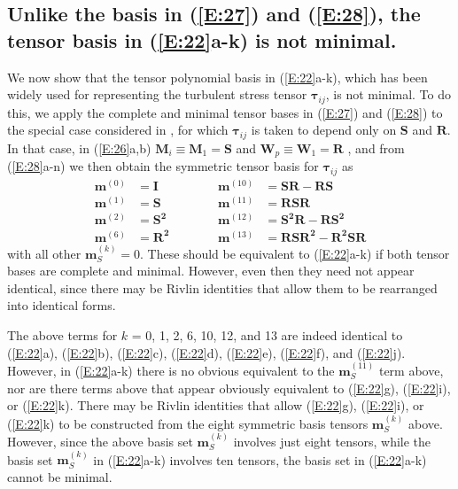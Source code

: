 \subsection{Unlike the basis in (\ref{E:27}) and (\ref{E:28}), the tensor basis in (\ref{E:22}a-k) is not minimal.}
\label{sec:2B}

We now show that the tensor polynomial basis in (\ref{E:22}a-k), which has been widely used for representing the turbulent stress tensor $\mathbf{\tau}_{ij}$, is not minimal. To do this, we apply the complete and minimal tensor bases in (\ref{E:27}) and (\ref{E:28}) to the special case considered in , for which $\mathbf{\tau}_{ij}$ is taken to depend only on $\mathbf{S}$ and $\mathbf{R}$.  In that case, in (\ref{E:26}a,b) $\mathbf{M}_i \equiv \mathbf{M}_1 = \mathbf{S}$ and $\mathbf{W}_p \equiv \mathbf{W}_1 = \mathbf{R}$ , and from (\ref{E:28}a-n) we then obtain the symmetric tensor basis for  $\mathbf{\tau}_{ij}$ as
%
\begin{equation}
\begin{aligned}
\label{E:ASU8}
	\mathbf{m}^{(0)} &= \mathbf{I}    \qquad\qquad&  \mathbf{m}^{(10)}  &= \mathbf{SR}-\mathbf{RS}  \\ 
	\mathbf{m}^{(1)} &= \mathbf{S}    &  \mathbf{m}^{(11)}  &= \mathbf{RSR} \\
	\mathbf{m}^{(2)} &= \mathbf{S^2}  &  \mathbf{m}^{(12)}  &= \mathbf{S^2R}-\mathbf{RS^2}  \\
	\mathbf{m}^{(6)} &= \mathbf{R^2}  &  \mathbf{m}^{(13)}  &= \mathbf{RSR^2}-\mathbf{R^2SR} 
\end{aligned}
\end{equation}
%
%   	 
with all other $\mathbf{m}^{(k)}_S= 0$. These should be equivalent to (\ref{E:22}a-k) if both tensor bases are complete and minimal.  However, even then they need not appear identical, since there may be Rivlin identities that allow them to be rearranged into identical forms.

The above terms for $k$ = 0, 1, 2, 6, 10, 12, and 13 are indeed identical to (\ref{E:22}a), (\ref{E:22}b), (\ref{E:22}c), (\ref{E:22}d), (\ref{E:22}e), (\ref{E:22}f), and (\ref{E:22}j). However, in (\ref{E:22}a-k) there is no obvious equivalent to the $\mathbf{m}^{(11)}_S$  term above, nor are there terms above that appear obviously equivalent to (\ref{E:22}g), (\ref{E:22}i), or (\ref{E:22}k). There may be Rivlin identities that allow (\ref{E:22}g), (\ref{E:22}i), or (\ref{E:22}k) to be constructed from the eight symmetric basis tensors  $\mathbf{m}^{(k)}_S$ above. However, since the above basis set $\mathbf{m}^{(k)}_S$ involves just eight tensors, while the basis set  $\mathbf{m}^{(k)}_S$  in (\ref{E:22}a-k) involves ten tensors, the basis set in (\ref{E:22}a-k) cannot be minimal.

